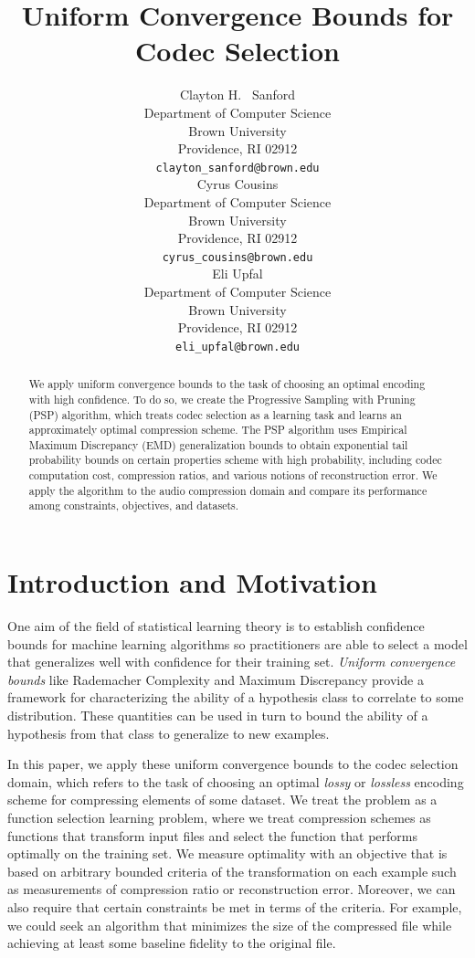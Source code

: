 \documentclass{article}
\title{Uniform Convergence Bounds for Codec Selection}
\author{
  Clayton H. ~Sanford \\ %
  Department of Computer Science\\
  Brown University\\
  Providence, RI 02912 \\
  \texttt{clayton\_sanford@brown.edu} \\
  \And
  Cyrus Cousins \\
  Department of Computer Science\\
  Brown University\\
  Providence, RI 02912 \\
  \texttt{cyrus\_cousins@brown.edu} \\
  \And
  Eli Upfal \\
  Department of Computer Science\\
  Brown University\\
  Providence, RI 02912 \\
  \texttt{eli\_upfal@brown.edu} \\
}
\newcommand{\cc}[1]{\textcolor{blue}{Cyrus: \textbf{#1}}}
\begin{document}

\maketitle

\begin{abstract}
We apply uniform convergence bounds to the task of choosing an optimal encoding with high confidence. To do so, we create the Progressive Sampling with Pruning (PSP) algorithm, which treats codec selection as a learning task and learns an approximately optimal compression scheme. The PSP algorithm uses Empirical Maximum Discrepancy (EMD) generalization bounds to obtain exponential tail probability bounds on certain properties scheme with high probability, including codec computation cost, compression ratios, and various notions of reconstruction error. We apply the algorithm to the audio compression domain and compare its performance among constraints, objectives, and datasets.

\end{abstract}

\section{Introduction and Motivation}
One aim of the field of statistical learning theory is to establish confidence bounds for machine learning algorithms so practitioners are able to select a model that generalizes well with confidence for their training set. \textit{Uniform convergence bounds} like Rademacher Complexity \citep{bartlett-rademacher} and Maximum Discrepancy \citep{bartlett-emd} provide a framework for characterizing the ability of a hypothesis class to correlate to some distribution. These quantities can be used in turn to bound the ability of a hypothesis from that class to generalize to new examples.

In this paper, we apply these uniform convergence bounds to the codec selection domain, which refers to the task of choosing an optimal \textit{lossy} or \textit{lossless} encoding scheme for compressing elements of some dataset. We treat the problem as a function selection learning problem, where we treat compression schemes as functions that transform input files and select the function that performs optimally on the training set. We measure optimality with an objective that is based on arbitrary bounded criteria of the transformation on each example such as measurements of compression ratio or reconstruction error. Moreover, we can also require that certain constraints be met in terms of the criteria. For example, we could seek an algorithm that minimizes the size of the compressed file while achieving at least some baseline fidelity to the original file.
\end{document}
